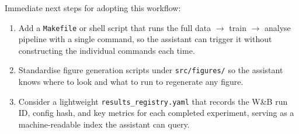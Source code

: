 \documentclass[11pt]{article}
\begin{document}
Immediate next steps for adopting this workflow:
\begin{enumerate}[leftmargin=1.5em]
  \item Add a \texttt{Makefile} or shell script that runs the full
        data $\to$ train $\to$ analyse pipeline with a single command,
        so the assistant can trigger it without constructing the
        individual commands each time.
  \item Standardise figure generation scripts under
        \texttt{src/figures/} so the assistant knows where to look and
        what to run to regenerate any figure.
  \item Consider a lightweight \texttt{results\_registry.yaml} that
        records the W\&B run ID, config hash, and key metrics for each
        completed experiment, serving as a machine-readable index the
        assistant can query.
\end{enumerate}
\end{document}
